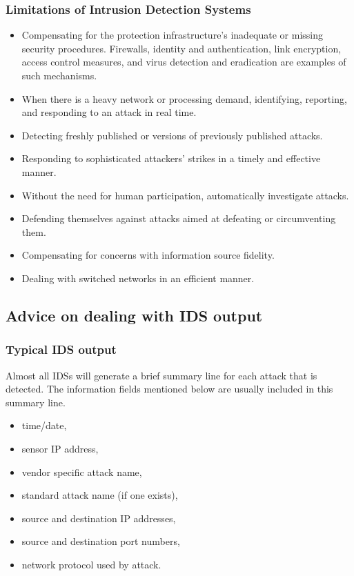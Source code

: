 \documentclass[12pt]{article}
\begin{document}
    \subsubsection{Limitations of Intrusion Detection Systems} 
    \begin{itemize}
        \item Compensating for the protection infrastructure's inadequate or missing security procedures. Firewalls, identity and authentication, link encryption, access control measures, and virus detection and eradication are examples of such mechanisms.
        \item When there is a heavy network or processing demand, identifying, reporting, and responding to an attack in real time.
        \item Detecting freshly published or versions of previously published attacks.
        \item Responding to sophisticated attackers' strikes in a timely and effective manner.
        \item Without the need for human participation, automatically investigate attacks.
        \item Defending themselves against attacks aimed at defeating or circumventing them.
        \item Compensating for concerns with information source fidelity.
        \item Dealing with switched networks in an efficient manner.
    \end{itemize}
    
    \subsection{Advice on dealing with IDS output}
    \subsubsection{Typical IDS output}
    \par Almost all IDSs will generate a brief summary line for each attack that is detected. The information fields mentioned below are usually included in this summary line.
    
    \begin{itemize}
        \item time/date,
        \item sensor IP address,
        \item vendor specific attack name,
        \item standard attack name (if one exists),
        \item source and destination IP addresses,
        \item source and destination port numbers,
        \item network protocol used by attack.
    \end{itemize}
    
\end{document}
